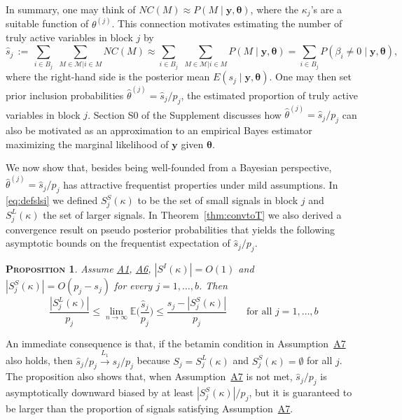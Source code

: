 \documentclass[bj,authoryear]{imsart}
\theoremstyle{plain}
\newtheorem{prop}[thm]{\textsc{Proposition}}
\newcommand{\E}{\mathbb{E}}
\newcommand{\M}{\mathcal{M}}
\newcommand{\bs}{\boldsymbol}
\begin{document}
In summary, one may think of $NC(M) \approx P(M \mid \bs y,\bs \theta)$, where the $\kappa_j$'s are a suitable function of $\theta^{(j)}$. %
This connection motivates estimating the number of truly active variables in block $j$ by %
\begin{equation}\label{eq:shat}
    \hat{s}_j \,:=\, \sum_{i\in B_j}\,\,\sum_{M\in \M | i \in M}NC(M)
\approx    \sum_{i\in B_j}\,\,\sum_{M\in \M | i \in M}P(M\mid \bs y,\bs \theta) = \sum_{i\in B_j}P(\beta_i \neq 0 \mid \bs y,\bs \theta),
\end{equation}
where the right-hand side is the posterior mean $E(s_j \mid \bs y,\bs \theta)$.
One may then set prior inclusion probabilities $\hat{\theta}^{(j)}= \hat{s}_j/p_j$, the estimated proportion of truly active variables in block $j$.
Section S0 of the Supplement discusses how $\hat{\theta}^{(j)}=\hat{s}_j/p_j$ can also be motivated as an approximation to an empirical Bayes estimator maximizing the marginal likelihood of $\bs y$ given $\bs \theta$.

We now show that, besides being well-founded from a Bayesian perspective, $\hat{\theta}^{(j)}=\hat{s}_j/p_j$ %
has attractive frequentist properties under mild assumptions. In \eqref{eq:defslsi} we defined $S^{S}_j(\kappa)$ to be the set of small signals in block $j$ and  $S^{L}_j(\kappa)$ the set of larger signals. In Theorem~\ref{thm:convtoT} we also derived a convergence result on pseudo posterior probabilities that yields the following asymptotic bounds on the frequentist expectation of $\hat{s}_j/p_j$.
\begin{prop}
    \label{prop:shatconsistence}
Assume \hyperlink{lab:A1}{A1}, \hyperlink{lab:A6}{A6}, $|S^{I}(\kappa)|=O(1)$ and $|S^{S}_j(\kappa)|=O(p_j-s_j)$ for every $j=1,\ldots,b$. Then
$$ \,\, \frac{|S^{L}_j(\kappa)|}{p_j}\leq \lim_{n\to\infty}\E\bigg(\frac{\hat{s}_j}{p_j}\bigg)\leq \frac{s_j-|S^{S}_j(\kappa)|}{p_j}\qquad\text{for all }j=1,\ldots,b$$
\end{prop}
An immediate consequence is that, if the betamin condition in Assumption~\hyperlink{lab:A7}{A7} also holds, then $\hat{s}_j/p_j \stackrel{L_1}{\longrightarrow} s_j/p_j$
because $S_j=S_j^{L}(\kappa)$ and $S_j^{S}(\kappa)=\emptyset$ for all $j$. The proposition also shows that, when Assumption~\hyperlink{lab:A7}{A7} is not met, $\hat{s}_j/p_j$ is asymptotically downward biased by at least $|S^{S}_j(\kappa)|/p_j$, but it is guaranteed to be larger than the proportion of signals satisfying Assumption~\hyperlink{lab:A7}{A7}. 
\end{document}
